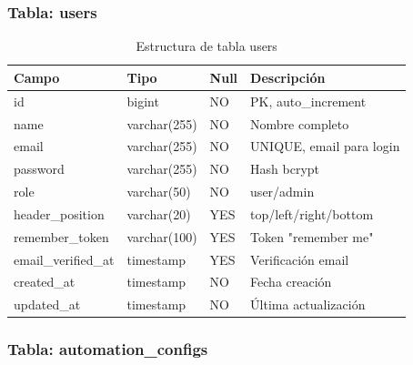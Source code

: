 \documentclass[12pt,a4paper]{article}
\begin{document}
\subsubsection{Tabla: users}

\begin{table}[H]
\centering
\small
\begin{tabular}{|l|l|l|p{4cm}|}
\hline
\textbf{Campo} & \textbf{Tipo} & \textbf{Null} & \textbf{Descripción} \\
\hline
id & bigint & NO & PK, auto\_increment \\
name & varchar(255) & NO & Nombre completo \\
email & varchar(255) & NO & UNIQUE, email para login \\
password & varchar(255) & NO & Hash bcrypt \\
role & varchar(50) & NO & user/admin \\
header\_position & varchar(20) & YES & top/left/right/bottom \\
remember\_token & varchar(100) & YES & Token "remember me" \\
email\_verified\_at & timestamp & YES & Verificación email \\
created\_at & timestamp & NO & Fecha creación \\
updated\_at & timestamp & NO & Última actualización \\
\hline
\end{tabular}
\caption{Estructura de tabla users}
\end{table}

\subsubsection{Tabla: automation\_configs}
\end{document}
